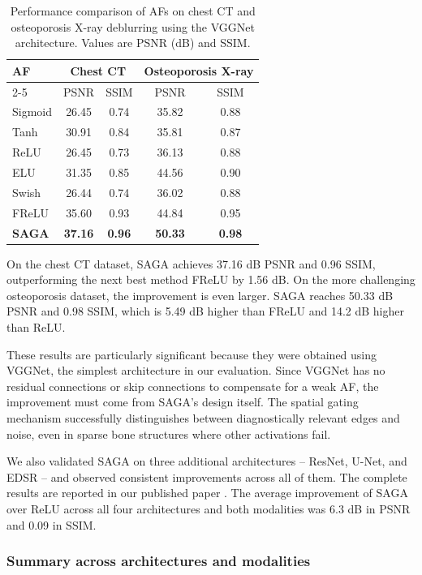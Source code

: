 \begin{table}[H]
	\centering
	\caption{Performance comparison of AFs on chest CT and osteoporosis X-ray deblurring using the VGGNet architecture. Values are PSNR (dB) and SSIM.}
	\label{tab:saga_comparison}
	\begin{tabular}{lcccc}
		\toprule
		\multirow{2}{*}{AF} & \multicolumn{2}{c}{Chest CT} & \multicolumn{2}{c}{Osteoporosis X-ray} \\
		\cline{2-5}
		& PSNR & SSIM & PSNR & SSIM \\
		\midrule
		Sigmoid & 26.45 & 0.74 & 35.82 & 0.88 \\
		Tanh & 30.91 & 0.84 & 35.81 & 0.87 \\
		ReLU & 26.45 & 0.73 & 36.13 & 0.88 \\
		ELU & 31.35 & 0.85 & 44.56 & 0.90 \\
		Swish & 26.44 & 0.74 & 36.02 & 0.88 \\
		FReLU & 35.60 & 0.93 & 44.84 & 0.95 \\
		\textbf{SAGA} & \textbf{37.16} & \textbf{0.96} & \textbf{50.33} & \textbf{0.98} \\
		\bottomrule
	\end{tabular}
\end{table}

On the chest CT dataset, SAGA achieves 37.16 dB PSNR and 0.96 SSIM, outperforming the next best method FReLU by 1.56 dB. On the more challenging osteoporosis dataset, the improvement is even larger. SAGA reaches 50.33 dB PSNR and 0.98 SSIM, which is 5.49 dB higher than FReLU and 14.2 dB higher than ReLU.

These results are particularly significant because they were obtained using VGGNet, the simplest architecture in our evaluation. Since VGGNet has no residual connections or skip connections to compensate for a weak AF, the improvement must come from SAGA's design itself. The spatial gating mechanism successfully distinguishes between diagnostically relevant edges and noise, even in sparse bone structures where other activations fail.

We also validated SAGA on three additional architectures – ResNet, U-Net, and EDSR – and observed consistent improvements across all of them. The complete results are reported in our published paper \citep{siju2026saga}. The average improvement of SAGA over ReLU across all four architectures and both modalities was 6.3 dB in PSNR and 0.09 in SSIM.

\subsubsection{Summary across architectures and modalities}

